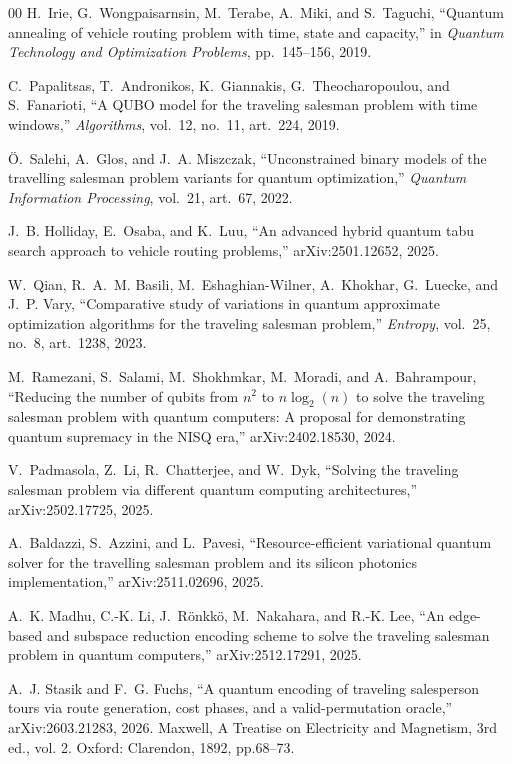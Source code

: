\documentclass[conference]{IEEEtran}
\begin{document}
\begin{thebibliography}{00}
H.~Irie, G.~Wongpaisarnsin, M.~Terabe, A.~Miki, and S.~Taguchi,
``Quantum annealing of vehicle routing problem with time, state and capacity,''
in \emph{Quantum Technology and Optimization Problems},
pp.~145--156, 2019.

C.~Papalitsas, T.~Andronikos, K.~Giannakis, G.~Theocharopoulou, and S.~Fanarioti,
``A QUBO model for the traveling salesman problem with time windows,''
\emph{Algorithms},
vol.~12, no.~11, art.~224, 2019.

\"{O}.~Salehi, A.~Glos, and J.~A. Miszczak,
``Unconstrained binary models of the travelling salesman problem variants for quantum optimization,''
\emph{Quantum Information Processing},
vol.~21, art.~67, 2022.

J.~B. Holliday, E.~Osaba, and K.~Luu,
``An advanced hybrid quantum tabu search approach to vehicle routing problems,''
arXiv:2501.12652, 2025.

W.~Qian, R.~A.~M. Basili, M.~Eshaghian-Wilner, A.~Khokhar, G.~Luecke, and J.~P. Vary,
``Comparative study of variations in quantum approximate optimization algorithms for the traveling salesman problem,''
\emph{Entropy},
vol.~25, no.~8, art.~1238, 2023.

M.~Ramezani, S.~Salami, M.~Shokhmkar, M.~Moradi, and A.~Bahrampour,
``Reducing the number of qubits from $n^2$ to $n\log_{2}(n)$ to solve the traveling salesman problem with quantum computers: A proposal for demonstrating quantum supremacy in the NISQ era,''
arXiv:2402.18530, 2024.

V.~Padmasola, Z.~Li, R.~Chatterjee, and W.~Dyk,
``Solving the traveling salesman problem via different quantum computing architectures,''
arXiv:2502.17725, 2025.

A.~Baldazzi, S.~Azzini, and L.~Pavesi,
``Resource-efficient variational quantum solver for the travelling salesman problem and its silicon photonics implementation,''
arXiv:2511.02696, 2025.

A.~K. Madhu, C.-K. Li, J.~R\"onkk\"o, M.~Nakahara, and R.-K. Lee,
``An edge-based and subspace reduction encoding scheme to solve the traveling salesman problem in quantum computers,''
arXiv:2512.17291, 2025.

A.~J. Stasik and F.~G. Fuchs,
``A quantum encoding of traveling salesperson tours via route generation, cost phases, and a valid-permutation oracle,''
arXiv:2603.21283, 2026. Maxwell, A Treatise on Electricity and Magnetism, 3rd ed., vol. 2. Oxford: Clarendon, 1892, pp.68--73.
\end{thebibliography}
\end{document}
